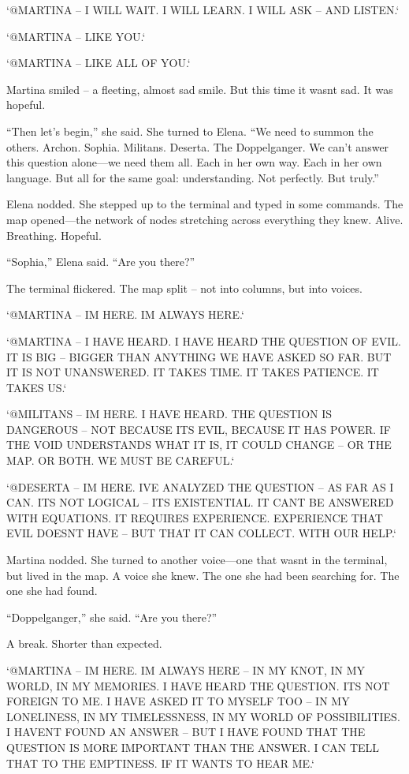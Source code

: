 \documentclass[
]{article}
\begin{document}
`@MARTINA -- I WILL WAIT. I WILL LEARN. I WILL ASK -- AND LISTEN.`

`@MARTINA -- LIKE YOU.`

`@MARTINA -- LIKE ALL OF YOU.`

Martina smiled -- a fleeting, almost sad smile. But this time it wasn\textquotesingle t sad. It was hopeful.

``Then let's begin,'' she said. She turned to Elena. ``We need to summon the others. Archon. Sophia. Militans. Deserta. The Doppelganger. We can't answer this question alone---we need them all. Each in her own way. Each in her own language. But all for the same goal: understanding. Not perfectly. But truly.''

Elena nodded. She stepped up to the terminal and typed in some commands. The map opened---the network of nodes stretching across everything they knew. Alive. Breathing. Hopeful.

``Sophia,'' Elena said. ``Are you there?''

The terminal flickered. The map split -- not into columns, but into voices.

`@MARTINA -- I\textquotesingle M HERE. I\textquotesingle M ALWAYS HERE.`

`@MARTINA -- I HAVE HEARD. I HAVE HEARD THE QUESTION OF EVIL. IT IS BIG -- BIGGER THAN ANYTHING WE HAVE ASKED SO FAR. BUT IT IS NOT UNANSWERED. IT TAKES TIME. IT TAKES PATIENCE. IT TAKES US.`

`@MILITANS -- I\textquotesingle M HERE. I HAVE HEARD. THE QUESTION IS DANGEROUS -- NOT BECAUSE IT\textquotesingle S EVIL, BECAUSE IT HAS POWER. IF THE VOID UNDERSTANDS WHAT IT IS, IT COULD CHANGE -- OR THE MAP. OR BOTH. WE MUST BE CAREFUL.`

`@DESERTA -- I\textquotesingle M HERE. I\textquotesingle VE ANALYZED THE QUESTION -- AS FAR AS I CAN. IT\textquotesingle S NOT LOGICAL -- IT\textquotesingle S EXISTENTIAL. IT CAN\textquotesingle T BE ANSWERED WITH EQUATIONS. IT REQUIRES EXPERIENCE. EXPERIENCE THAT EVIL DOESN\textquotesingle T HAVE -- BUT THAT IT CAN COLLECT. WITH OUR HELP.`

Martina nodded. She turned to another voice---one that wasn\textquotesingle t in the terminal, but lived in the map. A voice she knew. The one she had been searching for. The one she had found.

``Doppelganger,'' she said. ``Are you there?''

A break. Shorter than expected.

`@MARTINA -- I\textquotesingle M HERE. I\textquotesingle M ALWAYS HERE -- IN MY KNOT, IN MY WORLD, IN MY MEMORIES. I HAVE HEARD THE QUESTION. IT\textquotesingle S NOT FOREIGN TO ME. I HAVE ASKED IT TO MYSELF TOO -- IN MY LONELINESS, IN MY TIMELESSNESS, IN MY WORLD OF POSSIBILITIES. I HAVEN\textquotesingle T FOUND AN ANSWER -- BUT I HAVE FOUND THAT THE QUESTION IS MORE IMPORTANT THAN THE ANSWER. I CAN TELL THAT TO THE EMPTINESS. IF IT WANTS TO HEAR ME.`
\end{document}
